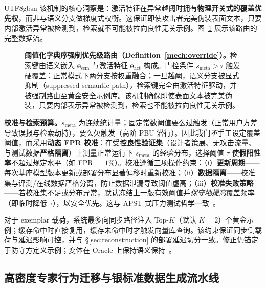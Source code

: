 \documentclass[letterpaper,twocolumn,10pt]{article}
\begin{document}
\begin{CJK}{UTF8}{gbsn}
\noindent 该机制的核心洞察是：激活特征在异常越阈时拥有\textbf{物理开关式的覆盖优先权}，而非与语义分支做梯度式权衡。这保证即使攻击者完美伪装表面文本，只要内部激活异常被检测到，检索就不可能被拉向良性无关示例。图~\ref{fig:jointkey} 展示该路由的完整数据流。

\begin{figure}[t]
\centering
{}
\caption{\textbf{阈值化字典序强制优先级路由（Definition~\ref{mech:override}）。}检索键由语义嵌入 $\mathbf{e}_{\mathrm{sem}}$ 与激活特征 $\mathbf{e}_{\mathrm{act}}$ 构成。门控条件 $s_{\mathrm{meta}} > \tau$ 触发硬覆盖：正常模式下两分支按权重融合；一旦越阈，语义分支被显式抑制（suppressed semantic path），检索键完全由激活特征驱动，并被强制路由至黄金安全示例库。该机制确保即使表面文本被完美伪装，只要内部表示异常被检测到，检索也不能被拉向良性无关示例。}
\label{fig:jointkey}
\end{figure}

\textbf{校准与检索预算。}$s_{\mathrm{meta}}$ 为连续统计量；固定常数阈值要么过触发（正常用户方差导致误报与检索劫持），要么欠触发（高阶 PBU 潜行）。因此我们\emph{不}手工设定覆盖阈值，而采用\textbf{动态 FPR 校准}：在受控\textbf{良性验证集}（设计者策展、无攻击流量、与测试数据\textbf{严格隔离}）上测量正常运行下 $s_{\mathrm{meta}}$ 的经验分布，选择阈值 $\tau$ 使\textbf{假阳性率}不超过规定水平（如 FPR $= 1\%$）。校准遵循三项操作约束：（i）\textbf{更新周期}——每次基座模型版本更新或部署分布显著偏移时重新校准；（ii）\textbf{数据隔离}——校准集与评测/在线数据严格分离，防止数据泄漏导致阈值虚高；（iii）\textbf{校准失败策略}——若校准集不足或分布异常，默认冻结上一版有效阈值并\emph{保守地提高}覆盖频率（即临时降低 $\tau$），以安全优先。这与 APST 式压力测试哲学一致~\cite{apst}。

\noindent 对于 exemplar 载荷，系统最多向同步路径注入 Top-$K$（默认 $K=2$）个黄金示例；缓存命中时直接复用，缓存未命中时才触发向量库查询。该约束保证同步侧载荷与延迟影响可控，并与 \S\ref{sec:reconstruction} 的部署延迟切分一致。修正仍锚定于防守方定义示例；变体在 Oracle 上保持语义保持~\cite{ControlledMutation_SafetyEval,jade-linguistics}。

\subsection{高密度专家行为迁移与银标准数据生成流水线}
\label{sec:silver}


\end{CJK}
\end{document}

